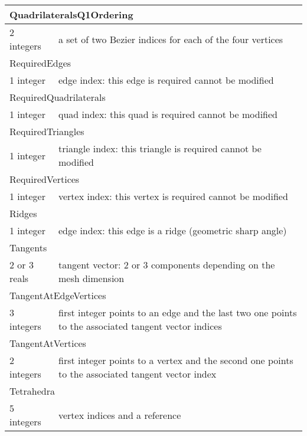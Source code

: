 \documentclass[a4paper,12pt]{article}
\begin{document}
\begin{longtable}{|m{4cm}|m{11cm}|}
\multicolumn{2}{|l|}{QuadrilateralsQ1Ordering} \\
\hline
2 integers & a set of two Bezier indices for each of the four vertices \\
\hline\hline

\multicolumn{2}{|l|}{RequiredEdges} \\
\hline
1 integer & edge index: this edge is required cannot be modified \\
\hline\hline

\multicolumn{2}{|l|}{RequiredQuadrilaterals} \\
\hline
1 integer & quad index: this quad is required cannot be modified \\
\hline\hline

\multicolumn{2}{|l|}{RequiredTriangles} \\
\hline
1 integer & triangle index: this triangle is required cannot be modified \\
\hline\hline

\multicolumn{2}{|l|}{RequiredVertices} \\
\hline
1 integer & vertex index: this vertex is required cannot be modified \\
\hline\hline

\multicolumn{2}{|l|}{Ridges} \\
\hline
1 integer & edge index: this edge is a ridge (geometric sharp angle) \\
\hline\hline

\multicolumn{2}{|l|}{Tangents} \\
\hline
2 or 3 reals & tangent vector: 2 or 3 components depending on the mesh dimension \\
\hline\hline

\multicolumn{2}{|l|}{TangentAtEdgeVertices} \\
\hline
3 integers & first integer points to an edge and the last two one points to the associated tangent vector indices \\
\hline\hline

\multicolumn{2}{|l|}{TangentAtVertices} \\
\hline
2 integers & first integer points to a vertex and the second one points to the associated tangent vector index \\
\hline\hline

\multicolumn{2}{|l|}{Tetrahedra} \\
\hline
5 integers & vertex indices and a reference \\
\hline\hline


\end{longtable}
\end{document}
